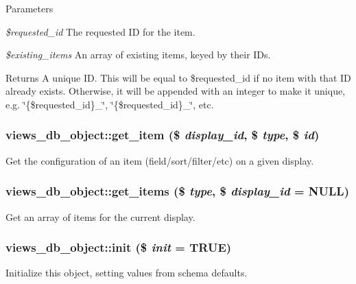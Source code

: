 \begin{DoxyParams}{Parameters}
\item[{\em \$requested\_\-id}]The requested ID for the item. \item[{\em \$existing\_\-items}]An array of existing items, keyed by their IDs.\end{DoxyParams}
\begin{DoxyReturn}{Returns}
A unique ID. This will be equal to \$requested\_\-id if no item with that ID already exists. Otherwise, it will be appended with an integer to make it unique, e.g. \char`\"{}\{\$requested\_\-id\}\_\char`\"{}, \char`\"{}\{\$requested\_\-id\}\_\char`\"{}, etc. 
\end{DoxyReturn}
\hypertarget{classviews__db__object_a9c1010d4c58ebbda357940ac11c48ce1}{
\subsubsection[{get\_\-item}]{\setlength{\rightskip}{0pt plus 5cm}views\_\-db\_\-object::get\_\-item (\$ {\em display\_\-id}, \/  \$ {\em type}, \/  \$ {\em id})}}
\label{classviews__db__object_a9c1010d4c58ebbda357940ac11c48ce1}
Get the configuration of an item (field/sort/filter/etc) on a given display. \hypertarget{classviews__db__object_a20a7ac553af0e4e8ee6f676dce4b844b}{
\subsubsection[{get\_\-items}]{\setlength{\rightskip}{0pt plus 5cm}views\_\-db\_\-object::get\_\-items (\$ {\em type}, \/  \$ {\em display\_\-id} = {\ttfamily NULL})}}
\label{classviews__db__object_a20a7ac553af0e4e8ee6f676dce4b844b}
Get an array of items for the current display. \hypertarget{classviews__db__object_a5c50d8a10b9af37afa7c7c2bfde5e318}{
\subsubsection[{init}]{\setlength{\rightskip}{0pt plus 5cm}views\_\-db\_\-object::init (\$ {\em init} = {\ttfamily TRUE})}}
\label{classviews__db__object_a5c50d8a10b9af37afa7c7c2bfde5e318}
Initialize this object, setting values from schema defaults.


